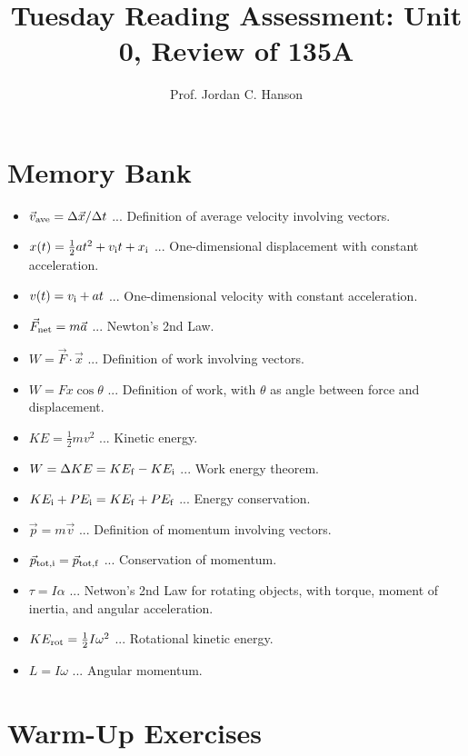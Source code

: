 \documentclass{article}
\begin{document}
\title{Tuesday Reading Assessment: Unit 0, Review of 135A}
\author{Prof. Jordan C. Hanson}

\maketitle

\section{Memory Bank}

\begin{itemize}
\item $\vec{v}_{\rm ave} = \Delta\vec{x}/\Delta t$ ... Definition of average velocity involving vectors.
\item $x(t) = \frac{1}{2}at^2 + v_{\rm i} t + x_{\rm i}$ ... One-dimensional displacement with constant acceleration.
\item $v(t) = v_{\rm i} + a t$ ... One-dimensional velocity with constant acceleration. 
\item $\vec{F}_{\rm net} = m\vec{a}$ ... Newton's 2nd Law.
\item $W = \vec{F} \cdot \vec{x}$ ... Definition of work involving vectors.
\item $W = Fx\cos\theta$ ... Definition of work, with $\theta$ as angle between force and displacement.
\item $KE = \frac{1}{2} m v^2$ ... Kinetic energy.
\item $W = \Delta KE = KE_{\rm f} - KE_{\rm i}$ ... Work energy theorem.
\item $KE_{\rm i} + PE_{\rm i} = KE_{\rm f} + PE_{\rm f}$ ... Energy conservation.
\item $\vec{p} = m\vec{v}$ ... Definition of momentum involving vectors.
\item $\vec{p}_{\rm tot,i} = \vec{p}_{\rm tot,f}$ ... Conservation of momentum.
\item $\tau = I\alpha$ ... Netwon's 2nd Law for rotating objects, with torque, moment of inertia, and angular acceleration.
\item $KE_{\rm rot} = \frac{1}{2}I \omega^2$ ... Rotational kinetic energy.
\item $L = I \omega$ ... Angular momentum.
\end{itemize}

\clearpage

\section{Warm-Up Exercises}
\end{document}
